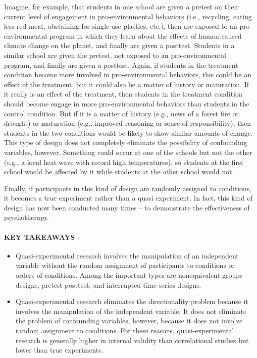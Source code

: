 \documentclass[
]{krantz}
\providecommand{\tightlist}{%
  \setlength{\itemsep}{0pt}\setlength{\parskip}{0pt}}
\begin{document}
Imagine, for example, that students in one school are given a pretest on their current level of engagement in pro-environmental behaviors (i.e., recycling, eating less red meat, abstaining for single-use plastics, etc.), then are exposed to an pro-environmental program in which they learn about the effects of human caused climate change on the planet, and finally are given a posttest. Students in a similar school are given the pretest, not exposed to an pro-environmental program, and finally are given a posttest. Again, if students in the treatment condition become more involved in pro-environmental behaviors, this could be an effect of the treatment, but it could also be a matter of history or maturation. If it really is an effect of the treatment, then students in the treatment condition should become engage in more pro-environmental behaviors than students in the control condition. But if it is a matter of history (e.g., news of a forest fire or drought) or maturation (e.g., improved reasoning or sense of responsibility), then students in the two conditions would be likely to show similar amounts of change. This type of design does not completely eliminate the possibility of confounding variables, however. Something could occur at one of the schools but not the other (e.g., a local heat wave with record high temperatures), so students at the first school would be affected by it while students at the other school would not.

Finally, if participants in this kind of design are randomly assigned to conditions, it becomes a true experiment rather than a quasi experiment. In fact, this kind of design has now been conducted many times -- to demonstrate the effectiveness of psychotherapy.

\paragraph*{KEY TAKEAWAYS}\label{key-takeaways-16}

\begin{itemize}
\tightlist
\item
  Quasi-experimental research involves the manipulation of an independent variable without the random assignment of participants to conditions or orders of conditions. Among the important types are nonequivalent groups designs, pretest-posttest, and interrupted time-series designs.
\item
  Quasi-experimental research eliminates the directionality problem because it involves the manipulation of the independent variable. It does not eliminate the problem of confounding variables, however, because it does not involve random assignment to conditions. For these reasons, quasi-experimental research is generally higher in internal validity than correlational studies but lower than true experiments.
\end{itemize}
\end{document}
